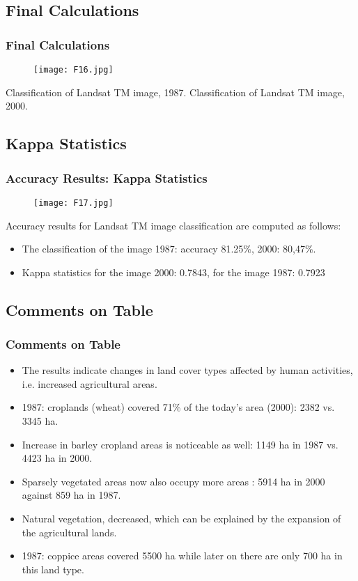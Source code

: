 \documentclass[pdflatex,compress,8pt,
	xcolor={dvipsnames,dvipsnames,svgnames,x11names,table},
	hyperref={colorlinks = true,
	breaklinks = true, 
	urlcolor = NavyBlue, 
	breaklinks = true}]{beamer}
\begin{document}
\subsection{Final Calculations}
\begin{frame}\frametitle{Final Calculations}
\begin{figure}[H]
	\centering
		\texttt{[image: F16.jpg]}
\end{figure}
Classification of Landsat TM image, 1987. 
Classification of Landsat TM image, 2000.
\end{frame}

\subsection{Kappa Statistics}
\begin{frame}\frametitle{Accuracy Results: Kappa Statistics}
\begin{figure}[H]
	\centering
		\texttt{[image: F17.jpg]}
\end{figure}
Accuracy results for Landsat TM image classification are computed as follows:
\begin{itemize}
	\item The classification of the image 1987: accuracy 81.25\%, 2000: 80,47\%.
	\item Kappa statistics for the  image 2000: 0.7843, for the image 1987: 0.7923
\end{itemize}
\end{frame}

\subsection{Comments on Table}
\begin{frame}\frametitle{Comments on Table}
\begin{itemize}
	\item The results indicate changes in land cover types affected by human activities, i.e. increased agricultural areas.
	\item 1987: croplands (wheat) covered 71\% of the today's area (2000): 2382 vs. 3345 ha.
	\item Increase in barley cropland areas is noticeable as well: 1149 ha in 1987 vs. 4423 ha in 2000.
	\item Sparsely vegetated areas now also occupy more areas : 5914 ha in 2000 against 859 ha in 1987.
	\item Natural vegetation, decreased, which can be explained by the expansion of the agricultural lands.
	\item 1987: coppice areas covered 5500 ha while later on there are only 700 ha in this land type.
\end{itemize}
\end{frame}
\end{document}
